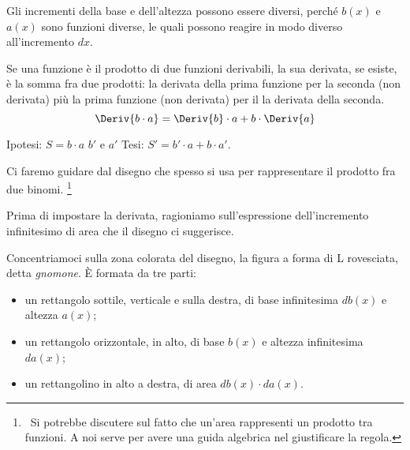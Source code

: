 \begin{osservazione}
Gli incrementi della base e dell'altezza possono essere 
diversi, perché \(b(x)\) e \(a(x)\) sono funzioni diverse, le quali possono
reagire in modo diverso all'incremento \(dx\).
\end{osservazione}

\begin{teorema}
Se una funzione è il prodotto di due funzioni derivabili, 
la sua  derivata, se esiste, è la somma fra due prodotti: la derivata 
della prima funzione per la seconda (non derivata) più la prima funzione 
(non derivata) per il la derivata della seconda.
\[\Deriv{b \cdot a}=\Deriv{b} \cdot a + b \cdot \Deriv{a}\]
\end{teorema}
\noindent Ipotesi: \(S = b \cdot a\) 
\(b'\) e \(a'\) \tab 
Tesi: \(S' = b' \cdot a + b \cdot a'\).

\begin{inaccessibleblock}
\end{inaccessibleblock}
\label{fig:Incre_prodotto}

Ci faremo guidare dal disegno che spesso si usa per rappresentare il 
prodotto fra due binomi. 
\footnote{~Si potrebbe discutere sul fatto che 
un'area rappresenti un prodotto tra funzioni. 
A noi serve per avere una guida algebrica nel giustificare la regola.}

Prima di impostare la derivata, ragioniamo sull'espressione 
dell'incremento infinitesimo di area che il disegno ci suggerisce. 

Concentriamoci sulla zona colorata del disegno, la figura a forma 
di L rovesciata, detta \emph{gnomone}. È formata da tre parti:
\begin{itemize} [nosep]
 \item un rettangolo sottile, verticale e sulla destra, di base
 infinitesima \(db(x)\) e altezza \(a(x)\);
 \item un rettangolo orizzontale, in alto, di base \(b(x)\) e
 altezza infinitesima \(da(x)\);
 \item un rettangolino in alto a destra, di area \(db(x) \cdot da(x)\).
\end{itemize}

